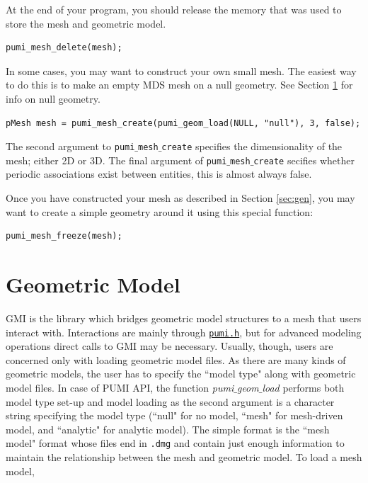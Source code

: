 \documentclass{article}
\begin{document}
At the end of your program, you should release the
memory that was used to store the mesh and geometric model.

\begin{lstlisting}
pumi_mesh_delete(mesh);
\end{lstlisting}

In some cases, you may want to construct your own small mesh.
The easiest way to do this is to make an empty MDS mesh
on a null geometry.
See Section \ref{sec:gmi} for info on null geometry.

\begin{lstlisting}
pMesh mesh = pumi_mesh_create(pumi_geom_load(NULL, "null"), 3, false);
\end{lstlisting}

The second argument to \texttt{pumi$\_$mesh$\_$create}
specifies the dimensionality of the mesh; either 2D or 3D.
The final argument of \texttt{pumi$\_$mesh$\_$create} secifies
whether periodic associations exist between entities, this is
almost always false.

Once you have constructed your mesh as described in Section \ref{sec:gen},
you may want to create a simple geometry around it using
this special function:

\begin{lstlisting}
pumi_mesh_freeze(mesh);
\end{lstlisting}

\section{Geometric Model}
\label{sec:gmi}

GMI is the library which bridges geometric model structures
to a mesh that users interact with.
Interactions are mainly through
\href{https://github.com/SCOREC/core/blob/master/pumi/pumi.h}{\texttt{pumi.h}},
but for advanced modeling operations direct calls to GMI may be necessary.
Usually, though, users are concerned only with loading geometric model files.
As there are many kinds of geometric models, the user has to specify the
``model type" along with geometric model files.
In case of PUMI API, the function \emph{pumi$\_$geom$\_$load} performs both
model type set-up and model loading as the second argument is a character
string specifying the model type (``null" for no model, ``mesh" for
mesh-driven model, and ``analytic" for analytic model).
The simple format is the ``mesh model" format whose files end in \texttt{.dmg}
and contain just enough information to maintain the relationship between the
mesh and geometric model.
To load a mesh model,
\end{document}

